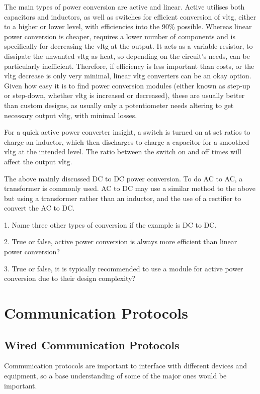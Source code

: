 \documentclass[a4paper,11pt]{report}
\newcommand{\Quiz}[1] %
{
\par\noindent %
\phantomsection %
\todo[inline, color=blue!30]{\textbf{#1}} %
\vspace{1em} %
}
\begin{document}
The main types of power conversion are active and linear. Active utilises both capacitors and inductors, as well as switches for efficient conversion of \gls{vltg}, either to a higher or lower level, with efficiencies into the 90\% possible. Whereas linear power conversion is cheaper, requires a lower number of components and is specifically for decreasing the \gls{vltg} at the output. It acts as a variable resistor, to dissipate the unwanted \gls{vltg} as heat, so depending on the circuit's needs, can be particularly inefficient. Therefore, if efficiency is less important than costs, or the \gls{vltg} decrease is only very minimal, linear \gls{vltg} converters can be an okay option. Given how easy it is to find power conversion modules (either known as step-up or step-down, whether \gls{vltg} is increased or decreased), these are usually better than custom designs, as usually only a potentiometer needs altering to get necessary output \gls{vltg}, with minimal losses.

For a quick active power converter insight, a switch is turned on at set ratios to charge an inductor, which then discharges to charge a capacitor for a smoothed \gls{vltg} at the intended level. The ratio between the switch on and off times will affect the output \gls{vltg}.

The above mainly discussed DC to DC power conversion. To do AC to AC, a transformer is commonly used. AC to DC may use a similar method to the above but using a transformer rather than an inductor, and the use of a rectifier to convert the AC to DC.

\Quiz{Quiz}

1. Name three other types of conversion if the example is DC to DC.

2. True or false, active power conversion is always more efficient than linear power conversion?

3. True or false, it is typically recommended to use a module for active power conversion due to their design complexity?

\section{Communication Protocols}

\subsection{Wired Communication Protocols}

Communication protocols are important to interface with different devices and equipment, so a base understanding of some of the major ones would be important.
\end{document}
